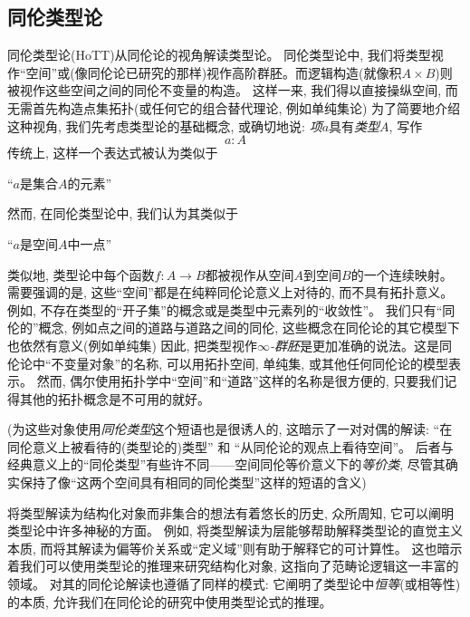 \subsection*{同伦类型论}

同伦类型论(HoTT)从同伦论的视角解读类型论。
同伦类型论中, 我们将类型视作``空间''或(像同伦论已研究的那样)视作高阶群胚。而逻辑构造(就像积$A \times B$)则被视作这些空间之间的同伦不变量的构造。
这样一来, 我们得以直接操纵空间, 而无需首先构造点集拓扑(或任何它的组合替代理论, 例如单纯集论)
为了简要地介绍这种视角, 我们先考虑类型论的基础概念, 或确切地说:
\emph{项}$a$具有\emph{类型}$A$, 写作
\[
a : A
\]
传统上, 这样一个表达式被认为类似于
\begin{center}
``$a$是集合$A$的元素''
\end{center}
然而, 在同伦类型论中, 我们认为其类似于
\begin{center}
``$a$是空间$A$中一点''
\end{center}

%

类似地, 类型论中每个函数$f: A\to B$都被视作从空间$A$到空间$B$的一个连续映射。
需要强调的是, 这些``空间''都是在纯粹同伦论意义上对待的, 而不具有拓扑意义。
例如, 不存在类型的``开子集''的概念或是类型中元素列的``收敛性''。
我们只有``同伦的''概念, 例如点之间的道路与道路之间的同伦, 这些概念在同伦论的其它模型下也依然有意义(例如单纯集)
因此, 把类型视作\emph{$\infty$-群胚}是更加准确的说法。这是同伦论中``不变量对象''的名称, 可以用拓扑空间, 
%
单纯集, 或其他任何同伦论的模型表示。
然而, 偶尔使用拓扑学中``空间''和``道路''这样的名称是很方便的, 只要我们记得其他的拓扑概念是不可用的就好。

(为这些对象使用\emph{同伦类型}这个短语也是很诱人的, 
%
这暗示了一对对偶的解读: ``在同伦意义上被看待的(类型论的)类型'' 和 ``从同伦论的观点上看待空间''。
后者与经典意义上的``同伦类型''有些许不同——空间同伦等价意义下的\emph{等价类}, 尽管其确实保持了像``这两个空间具有相同的同伦类型''这样的短语的含义)

将类型解读为结构化对象而非集合的想法有着悠长的历史, 众所周知, 它可以阐明类型论中许多神秘的方面。
例如, 将类型解读为层能够帮助解释类型论的直觉主义本质, 而将其解读为偏等价关系或``定义域''则有助于解释它的可计算性。
这也暗示着我们可以使用类型论的推理来研究结构化对象, 这指向了范畴论逻辑这一丰富的领域。
对其的同伦论解读也遵循了同样的模式: 它阐明了类型论中\emph{恒等}(或相等性)的本质, 允许我们在同伦论的研究中使用类型论式的推理。

